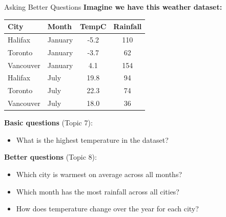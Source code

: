 \documentclass{csbeamer}
\begin{document}
\begin{frame}[fragile]{Asking Better Questions}
    \textbf{Imagine we have this weather dataset:}

    \vspace{0.5em}

    \begin{center}
    \begin{tabular}{|l|l|c|c|}
        \hline
        \textbf{City} & \textbf{Month} & \textbf{TempC} & \textbf{Rainfall} \\
        \hline
        Halifax   & January  & -5.2 & 110 \\
        Toronto   & January  & -3.7 & 62  \\
        Vancouver & January  &  4.1 & 154 \\
        Halifax   & July     & 19.8 & 94  \\
        Toronto   & July     & 22.3 & 74  \\
        Vancouver & July     & 18.0 & 36  \\
        \hline
    \end{tabular}
    \end{center}

    \vspace{0.8em}

    \textbf{Basic questions} (Topic 7):
    \begin{itemize}
        \item What is the highest temperature in the dataset?
    \end{itemize}

    \pause

    \vspace{0.4em}

    \textbf{\textcolor{marigold}{Better questions}} (Topic 8):
    \begin{itemize}
        \item<2-> Which \textcolor{stfxblue}{city} is warmest on average across all months?
        \item<3-> Which \textcolor{stfxblue}{month} has the most rainfall across all cities?
        \item<4-> How does temperature \textcolor{marigold}{change over the year} for each city?
    \end{itemize}

\end{frame}
\end{document}
